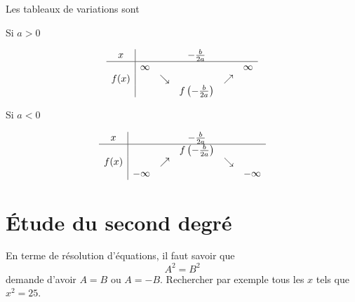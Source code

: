 Les tableaux de variations sont
\begin{multicols}{2}

    \begin{center}
        Si \( a>0\)

        \begin{equation*}
            \begin{array}[]{c|ccccc}
                x&&&-\frac{ b }{ 2a }&&\\
                \hline
                &\infty&&&&\infty\\
                f(x)&&\searrow&&\nearrow&\\
                &&&f\left( -\frac{ b }{ 2a } \right)&&\\
            \end{array}
        \end{equation*}
        
    \end{center}

    \columnbreak

    \begin{center}
        Si \( a<0\)


        \begin{equation*}
            \begin{array}[]{c|ccccc}
                x&&&-\frac{ b }{ 2a }&&\\
                \hline
                &&&f\left( -\frac{ b }{ 2a } \right)&&\\
                f(x)&&\nearrow&&\searrow&\\
                &-\infty&&&&-\infty\\
            \end{array}
        \end{equation*}
    \end{center}
\end{multicols}

\section{Étude du second degré}

En terme de résolution d'équations, il faut savoir que
\begin{equation}
    A^2=B^2
\end{equation}
demande d'avoir \( A=B\) ou \( A=-B\). Rechercher par exemple tous les \( x\) tels que \( x^2=25\).


